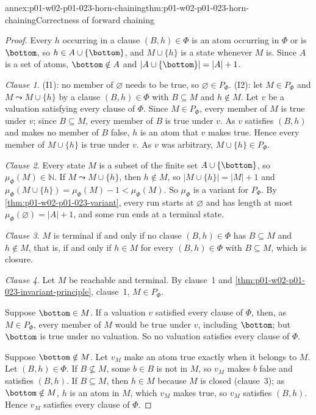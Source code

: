 \begin{annexitem}{annex:p01-w02-p01-023-horn-chaining}{thm:p01-w02-p01-023-horn-chaining}{Correctness of forward chaining}
\begin{proof}
Every \(h\) occurring in a clause \((B,h)\in\Phi\) is an atom occurring in
\(\Phi\) or is \(\bottom\), so \(h\in A\cup\{\bottom\}\), and
\(M\cup\{h\}\) is a state whenever \(M\) is. Since \(A\) is a set of atoms,
\(\bottom\notin A\) and \(\lvert A\cup\{\bottom\}\rvert=\lvert A\rvert+1\).

\emph{Clause 1.} (I1): no member of \(\varnothing\) needs to be true, so
\(\varnothing\in P_\Phi\). (I2): let \(M\in P_\Phi\) and
\(M\leadsto M\cup\{h\}\) by a clause \((B,h)\in\Phi\) with \(B\subseteq M\)
and \(h\notin M\). Let \(v\) be a valuation satisfying every clause of
\(\Phi\). Since \(M\in P_\Phi\), every member of \(M\) is true under \(v\);
since \(B\subseteq M\), every member of \(B\) is true under \(v\). As \(v\)
satisfies \((B,h)\) and makes no member of \(B\) false, \(h\) is an atom
that \(v\) makes true. Hence every member of \(M\cup\{h\}\) is true under
\(v\). As \(v\) was arbitrary, \(M\cup\{h\}\in P_\Phi\).

\emph{Clause 2.} Every state \(M\) is a subset of the finite set
\(A\cup\{\bottom\}\), so \(\mu_\Phi(M)\in\mathbb N\). If
\(M\leadsto M\cup\{h\}\), then \(h\notin M\), so
\(\lvert M\cup\{h\}\rvert=\lvert M\rvert+1\) and
\(\mu_\Phi(M\cup\{h\})=\mu_\Phi(M)-1<\mu_\Phi(M)\). So \(\mu_\Phi\) is a
variant for \(P_\Phi\). By \cref{thm:p01-w02-p01-023-variant}, every run
starts at \(\varnothing\) and has length at most
\(\mu_\Phi(\varnothing)=\lvert A\rvert+1\), and some run ends at a terminal
state.

\emph{Clause 3.} \(M\) is terminal if and only if no clause
\((B,h)\in\Phi\) has \(B\subseteq M\) and \(h\notin M\), that is, if and
only if \(h\in M\) for every \((B,h)\in\Phi\) with \(B\subseteq M\), which
is closure.

\emph{Clause 4.} Let \(M\) be reachable and terminal. By clause~1 and
\cref{thm:p01-w02-p01-023-invariant-principle}, clause~1,
\(M\in P_\Phi\).

Suppose \(\bottom\in M\). If a valuation \(v\) satisfied every clause of
\(\Phi\), then, as \(M\in P_\Phi\), every member of \(M\) would be true under
\(v\), including \(\bottom\); but \(\bottom\) is true under no valuation. So
no valuation satisfies every clause of \(\Phi\).

Suppose \(\bottom\notin M\). Let \(v_M\) make an atom true exactly when it
belongs to \(M\). Let \((B,h)\in\Phi\). If \(B\not\subseteq M\), some
\(b\in B\) is not in \(M\), so \(v_M\) makes \(b\) false and satisfies
\((B,h)\). If \(B\subseteq M\), then \(h\in M\) because \(M\) is closed
(clause~3); as \(\bottom\notin M\), \(h\) is an atom in \(M\), which
\(v_M\) makes true, so \(v_M\) satisfies \((B,h)\). Hence \(v_M\) satisfies
every clause of \(\Phi\).


\end{proof}
\end{annexitem}
